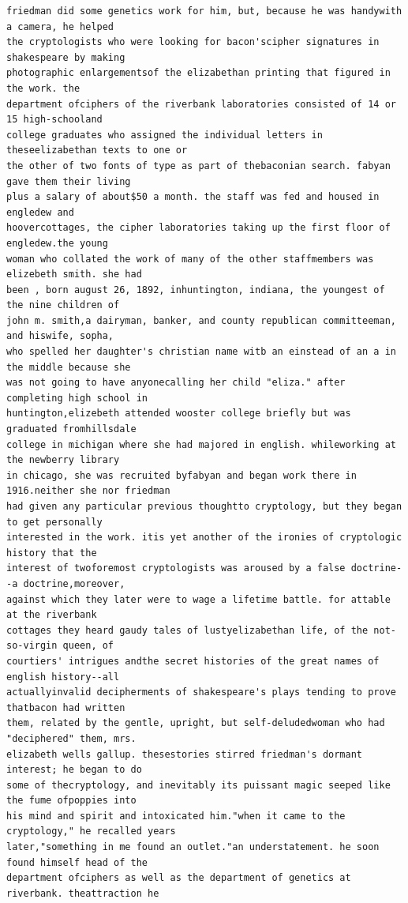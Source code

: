 \begin{lstlisting}[language={}]
friedman did some genetics work for him, but, because he was handywith a camera, he helped
the cryptologists who were looking for bacon'scipher signatures in shakespeare by making
photographic enlargementsof the elizabethan printing that figured in the work. the
department ofciphers of the riverbank laboratories consisted of 14 or 15 high-schooland
college graduates who assigned the individual letters in theseelizabethan texts to one or
the other of two fonts of type as part of thebaconian search. fabyan gave them their living
plus a salary of about$50 a month. the staff was fed and housed in engledew and
hoovercottages, the cipher laboratories taking up the first floor of engledew.the young
woman who collated the work of many of the other staffmembers was elizebeth smith. she had
been , born august 26, 1892, inhuntington, indiana, the youngest of the nine children of
john m. smith,a dairyman, banker, and county republican committeeman, and hiswife, sopha,
who spelled her daughter's christian name witb an einstead of an a in the middle because she
was not going to have anyonecalling her child "eliza." after completing high school in
huntington,elizebeth attended wooster college briefly but was graduated fromhillsdale
college in michigan where she had majored in english. whileworking at the newberry library
in chicago, she was recruited byfabyan and began work there in 1916.neither she nor friedman
had given any particular previous thoughtto cryptology, but they began to get personally
interested in the work. itis yet another of the ironies of cryptologic history that the
interest of twoforemost cryptologists was aroused by a false doctrine--a doctrine,moreover,
against which they later were to wage a lifetime battle. for attable at the riverbank
cottages they heard gaudy tales of lustyelizabethan life, of the not-so-virgin queen, of
courtiers' intrigues andthe secret histories of the great names of english history--all
actuallyinvalid decipherments of shakespeare's plays tending to prove thatbacon had written
them, related by the gentle, upright, but self-deludedwoman who had "deciphered" them, mrs.
elizabeth wells gallup. thesestories stirred friedman's dormant interest; he began to do
some of thecryptology, and inevitably its puissant magic seeped like the fume ofpoppies into
his mind and spirit and intoxicated him."when it came to the cryptology," he recalled years
later,"something in me found an outlet."an understatement. he soon found himself head of the
department ofciphers as well as the department of genetics at riverbank. theattraction he

\end{lstlisting}
